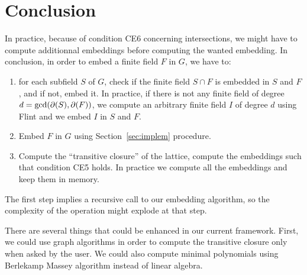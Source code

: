 \documentclass[11pt]{article}
\begin{document}
\section{Conclusion}

In practice, because of condition CE6 concerning intersections, we might have to
compute additionnal embeddings before computing the wanted embedding. In
conclusion, in order to embed a finite field $F$ in $G$, we have to:

\begin{enumerate}
  \item for each subfield $S$ of $G$, check if the finite field $S\cap F$ is 
    embedded in $S$ and $F$, and if not, embed it. In practice, if there is not
    any finite field of degree $d=\gcd(\partial(S), \partial(F))$, we compute an
    arbitrary finite field $I$ of degree $d$ using Flint
    and we embed $I$ in $S$ and $F$.
  \item Embed $F$ in $G$ using Section~\ref{sec:implem} procedure.
  \item Compute the ``transitive closure'' of the lattice, \ie compute the
    embeddings such that condition CE5 holds. In practice we compute all the
    embeddings and keep them in memory.
\end{enumerate}
The first step implies a recursive call to our embedding algorithm, so the
complexity of the operation might explode at that step.

There are several things that could be enhanced in our current framework. First,
we could use graph algorithms in order to compute the transitive closure only
when asked by the user. We could also compute minimal polynomials using
Berlekamp Massey algorithm instead of linear algebra.



\end{document}
